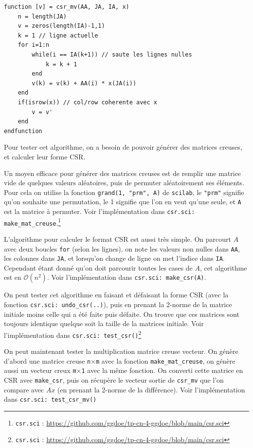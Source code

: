 \documentclass{article}
\begin{document}
\begin{scriptsize}
\centering
\begin{verbatim}
function [v] = csr_mv(AA, JA, IA, x)
    n = length(JA)
    v = zeros(length(IA)-1,1)
    k = 1 // ligne actuelle
    for i=1:n
        while(i == IA(k+1)) // saute les lignes nulles
            k = k + 1
        end
        v(k) = v(k) + AA(i) * x(JA(i))
    end
    if(isrow(x)) // col/row coherente avec x
        v = v'
    end
endfunction
\end{verbatim}
\end{scriptsize}

Pour tester cet algorithme, on a besoin de pouvoir générer des matrices creuses, et calculer leur forme CSR.

Un moyen efficace pour générer des matrices creuses est de remplir une matrice vide de quelques valeurs aléatoires, puis de permuter aléatoirement ses éléments. Pour cela on utilise la fonction \texttt{grand(1, "prm", A)} de \texttt{scilab}, le \texttt{"prm"} signifie qu'on souhaite une permutation, le 1 signifie que l'on en veut qu'une seule, et \texttt{A} est la matrice à permuter. Voir l'implémentation dans \texttt{csr.sci: make\_mat\_creuse}.\footnote{\texttt{csr.sci} : \href{https://github.com/ggdoe/tp-cn-4-ggdoe/blob/main/csr.sci}{https://github.com/ggdoe/tp-cn-4-ggdoe/blob/main/csr.sci}}
\newline\indent

L'algorithme pour calculer le format CSR est aussi très simple. On parcourt \(A\) avec deux boucles \texttt{for} (selon les lignes), on note les valeurs non nulles dans \texttt{AA}, les colonnes dans \texttt{JA}, et lorsqu'on change de ligne on met l'indice dans \texttt{IA}. Cependant étant donné qu'on doit parcourir toutes les cases de \(A\), cet algorithme est en \(\mathcal{O}(n^2)\). Voir l'implémentation dans \texttt{csr.sci: make\_csr(A)}.

On peut tester cet algorithme en faisant et défaisant la forme CSR (avec la fonction \texttt{csr.sci: undo\_csr(..)}), puis en prenant la 2-norme de la matrice initiale moins celle qui a été faite puis défaite. On trouve que ces matrices sont toujours identique quelque soit la taille de la matrices initiale. Voir l'implémentation dans \texttt{csr.sci: test\_csr()}\footnote{\texttt{csr.sci} : \href{https://github.com/ggdoe/tp-cn-4-ggdoe/blob/main/csr.sci}{https://github.com/ggdoe/tp-cn-4-ggdoe/blob/main/csr.sci}}
\newline\indent

On peut maintenant tester la multiplication matrice creuse vecteur. On génère d'abord une matrice creuse \texttt{n}\(\times\)\texttt{m} avec la fonction \texttt{make\_mat\_creuse}, on génère aussi un vecteur creux \texttt{m}\(\times\)\texttt{1} avec la même fonction. On converti cette matrice en CSR avec \texttt{make\_csr}, puis on récupère le vecteur sortie de \texttt{csr\_mv} que l'on compare avec \(Ax\) (en prenant la 2-norme de la différence). Voir l'implémentation dans \texttt{csr.sci: test\_csr\_mv()}
\end{document}
